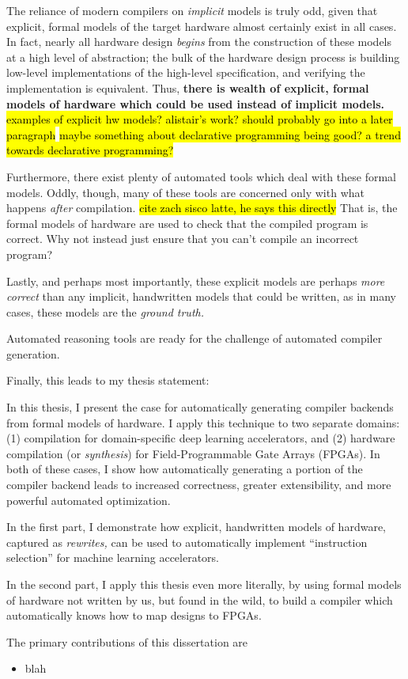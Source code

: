 The reliance of modern compilers
  on \textit{implicit} models is truly odd, 
  given that
  explicit, formal models
  of the target hardware
  almost certainly exist
  in all cases.
In fact, nearly all hardware design
  \textit{begins} from the construction
  of these models
  at a high level of abstraction;
  the bulk of the hardware design process
  is building low-level implementations
  of the high-level specification,
  and verifying the implementation
  is equivalent.
Thus, \textbf{there is wealth
  of explicit, formal models of hardware
  which could be used
  instead of implicit models.}
\hl{examples of explicit hw models? alistair's work?
should probably go into a later paragraph}
\hl{maybe something about declarative programming being good?
a trend towards declarative programming?}

Furthermore, 
  there exist plenty of automated
  tools
  which deal with
  these formal models.
Oddly, though,
  many of these tools
  are concerned only with
  what happens \textit{after}
  compilation.
\hl{cite zach sisco latte, he says this directly}
That is, the formal models
  of hardware
  are used to check that 
  the compiled program is correct.
Why not instead
  just ensure
  that you can't compile an incorrect
  program?

Lastly, and perhaps most importantly,
  these explicit models
  are perhaps \textit{more correct}
  than any implicit, handwritten models
  that could be written,
  as in many cases, these models
  are the \textit{ground truth.}

Automated reasoning tools
  are ready for the challenge
  of automated compiler generation.

Finally, this leads to my thesis statement:

In this thesis,
  I present the case for
  automatically generating compiler backends
  from
  formal models of hardware.
I apply this technique
  to two separate domains:
  (1) compilation for
  domain-specific 
  deep learning accelerators,
  and
  (2) hardware compilation 
  (or \textit{synthesis})
  for Field-Programmable
  Gate Arrays (FPGAs).
In both of these cases,
  I show how
  automatically generating
  a portion of the compiler backend
  leads to increased correctness,
  greater extensibility,
  and more powerful automated optimization.

In the first part,
  I demonstrate
  how explicit,
  handwritten
  models of hardware,
  captured as
  \textit{rewrites,}
  can be used 
  to automatically implement
  ``instruction selection''
  for machine learning
  accelerators.

In the second part,
  I apply this thesis
  even more literally, by using
  formal models of hardware
  not written by us,
  but found in the wild,
  to build a compiler
  which automatically knows
  how to map designs
  to FPGAs.

The primary contributions of this dissertation
  are
\begin{itemize}
    \item blah
\end{itemize}
  
  



